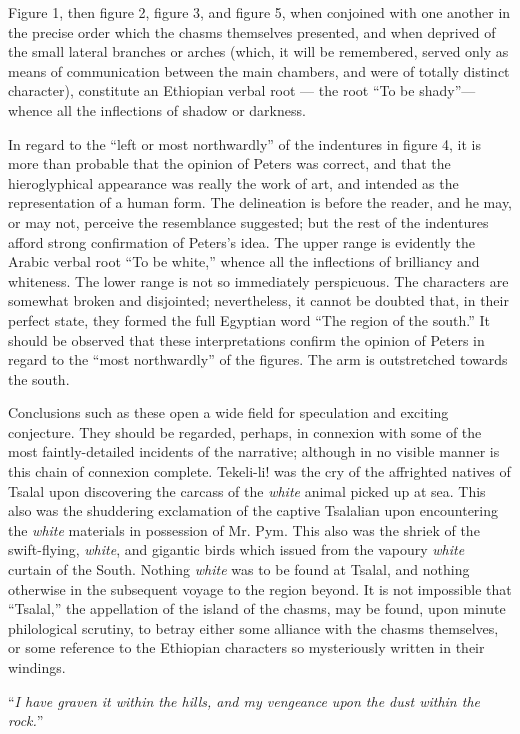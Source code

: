 Figure 1, then figure 2, figure 3, and figure 5, when conjoined with one
another in the precise order which the chasms themselves presented, and when
deprived of the small lateral branches or arches (which, it will be remembered,
served only as means of communication between the main chambers, and were of
totally distinct character), constitute an Ethiopian verbal root --- the root 
``To be shady''---whence all the inflections of shadow or
darkness. 

In regard to the ``left or most northwardly'' of the indentures in figure 4, it
is more than probable that the opinion of Peters was correct, and that the
hieroglyphical appearance was really the work of art, and intended as the
representation of a human form. The delineation is before the reader, and he
may, or may not, perceive the resemblance suggested; but the rest of the
indentures afford strong confirmation of Peters's idea. The upper range is
evidently the Arabic verbal root 
``To be white,'' whence all the inflections of brilliancy and whiteness. The lower
range is not so immediately perspicuous. The characters are somewhat broken and
disjointed; nevertheless, it cannot be doubted that, in their perfect state,
they formed the full Egyptian word 
``The region of the south.'' It should be observed that these interpretations
confirm the opinion of Peters in regard to the ``most northwardly'' of the
figures. The arm is outstretched towards the south. 

Conclusions such as these open a wide field for speculation and exciting
conjecture. They should be regarded, perhaps, in connexion with some of the most
faintly-detailed incidents of the narrative; although in no visible manner is
this chain of connexion complete. Tekeli-li! was the cry of the affrighted
natives of Tsalal upon discovering the carcass of the \emph{white} animal picked
up at sea. This also was the shuddering exclamation of the captive Tsalalian
upon encountering the \emph{white} materials in possession of Mr. Pym. This also
was the shriek of the swift-flying, \emph{white}, and gigantic birds which
issued from the vapoury \emph{white} curtain of the South. Nothing \emph{white}
was to be found at Tsalal, and nothing otherwise in the subsequent voyage to the
region beyond. It is not impossible that ``Tsalal,'' the appellation of the island
of the chasms, may be found, upon minute philological scrutiny, to betray either
some alliance with the chasms themselves, or some reference to the Ethiopian
characters so mysteriously written in their windings. 

``\emph{I have graven it within the hills, and my vengeance upon the dust within
the rock.}'' 
\bigskip
\begin{center}
\end{center}



